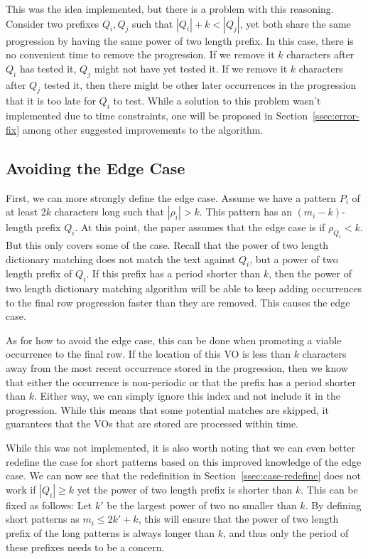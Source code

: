 \documentclass[ %
                    author={Dominic Joseph Moylett},
                    degree={MEng},
                     title={Dictionary Matching with Fingerprints},
                  subtitle={An Empirical Analysis},
                      type={research},
                      year={2015} ]{dissertation}
\begin{document}
This was the idea implemented, but there is a problem with this reasoning. Consider two prefixes $Q_i, Q_j$ such that $|Q_i| + k < |Q_j|$, yet both share the same progression by having the same power of two length prefix. In this case, there is no convenient time to remove the progression. If we remove it $k$ characters after $Q_i$ has tested it, $Q_j$ might not have yet tested it. If we remove it $k$ characters after $Q_j$ tested it, then there might be other later occurrences in the progression that it is too late for $Q_i$ to test. While a solution to this problem wasn't implemented due to time constraints, one will be proposed in Section~\ref{ssec:error-fix} among other suggested improvements to the algorithm.

\subsection{Avoiding the Edge Case}
\label{ssec:impl-edge-case}

First, we can more strongly define the edge case. Assume we have a pattern $P_i$ of at least $2k$ characters long such that $|\rho_i| > k$. This pattern has an $(m_i - k)$-length prefix $Q_i$. At this point, the paper assumes that the edge case is if $\rho_{Q_i} < k$. But this only covers some of the case. Recall that the power of two length dictionary matching does not match the text against $Q_i$, but a power of two length prefix of $Q_i$. If this prefix has a period shorter than $k$, then the power of two length dictionary matching algorithm will be able to keep adding occurrences to the final row progression faster than they are removed. This causes the edge case.

As for how to avoid the edge case, this can be done when promoting a viable occurrence to the final row. If the location of this VO is less than $k$ characters away from the most recent occurrence stored in the progression, then we know that either the occurrence is non-periodic or that the prefix has a period shorter than $k$. Either way, we can simply ignore this index and not include it in the progression. While this means that some potential matches are skipped, it guarantees that the VOs that are stored are processed within time.

While this was not implemented, it is also worth noting that we can even better redefine the case for short patterns based on this improved knowledge of the edge case. We can now see that the redefinition in Section~\ref{ssec:case-redefine} does not work if $|Q_i| \geq k$ yet the power of two length prefix is shorter than $k$. This can be fixed as follows: Let $k'$ be the largest power of two no smaller than $k$. By defining short patterns as $m_i \leq 2k' + k$, this will ensure that the power of two length prefix of the long patterns is always longer than $k$, and thus only the period of these prefixes needs to be a concern.
\end{document}
